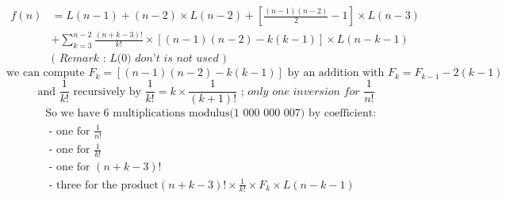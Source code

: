 \documentclass[10pt,a4paper]{letter}
\begin{document}
\begin{align*}
	f(n)&=L(n-1)+(n-2)\times L(n-2)+[\frac{(n-1)(n-2)}{2}-1]\times L(n-3)\\ &+\sum_{k=3}^{n-2}\frac{(n+k-3)!}{k!}\times [(n-1)(n-2)-k(k-1)]\times L(n-k-1) \\
	&\textit{( Remark : L(0) don't is not used )}
\end{align*}
$$
\text{we can compute }F_{k}=[(n-1)(n-2)-k(k-1)]\text{ by an addition with }
   F_{k}= F_{k-1}-2(k-1)
$$
$$
\text{and }\frac{1}{k!}\text{ recursively by }\frac{1}{k!}=k\times\frac{1}{(k+1)!}
\textit{ ; only one inversion for }\frac{1}{n!}$$
\begin{align*}
	&\text {So we have 6 multiplications modulus(1 000 000 007) by coefficient:}\\
	&\text{  - one for }\frac{1}{n!}\\
	&\text{  - one for }\frac{1}{k!}\\
	&\text{  - one for }(n+k-3)!\\
	&\text{  - three for the product}(n+k-3)!\times\frac{1}{k!}\times F_{k}\times  L(n-k-1)\\  
\end{align*}
\end{document}
